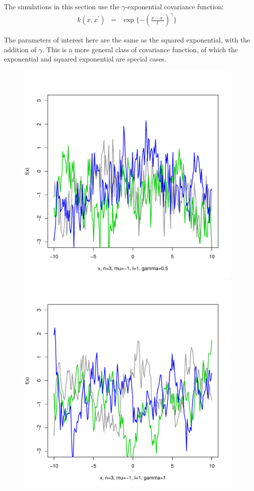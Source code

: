 \documentclass[12pt,letterpaper]{article}
\begin{document}
The simulations in this section use the $\gamma$-exponential covariance function:
\begin{eqnarray*}
k(x, x^{\prime}) &=& \exp \{ - (\frac{x - x^{\prime}}{\ell})^{\gamma} \}
\end{eqnarray*} 

The parameters of interest here are the same as the squared exponential, with the addition of $\gamma$. This is a more general class of covariance function, of which the exponential and squared exponential are special cases.

\begin{figure}
\begin{center}
\includegraphics[scale=0.2]{hw321/n3-m-1-l1-g1.pdf}
\includegraphics[scale=0.2]{hw321/n3-m-1-l1-g2.pdf}

\end{center}
\end{figure}
\end{document}
